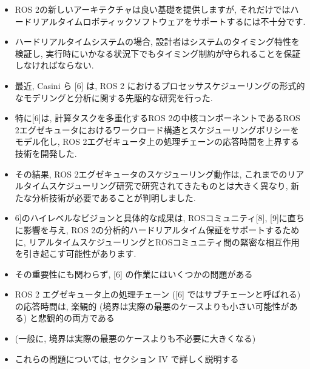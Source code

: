 \begin{frame}{}
    \begin{itemize}
        \item ROS 2の新しいアーキテクチャは良い基礎を提供しますが, それだけではハードリアルタイムロボティックソフトウェアをサポートするには不十分です.
        \item ハードリアルタイムシステムの場合, 設計者はシステムのタイミング特性を検証し, 実行時にいかなる状況下でもタイミング制約が守られることを保証しなければならない.
        \item 最近, Casini ら [6] は, ROS 2 におけるプロセッサスケジューリングの形式的なモデリングと分析に関する先駆的な研究を行った.
        \item 特に[6]は, 計算タスクを多重化するROS 2の中核コンポーネントであるROS 2エグゼキュータにおけるワークロード構造とスケジューリングポリシーをモデル化し, ROS 2エグゼキュータ上の処理チェーンの応答時間を上界する技術を開発した.
    \end{itemize}
\end{frame}

\begin{frame}{}
    \begin{itemize}
        \item その結果, ROS 2エグゼキュータのスケジューリング動作は, これまでのリアルタイムスケジューリング研究で研究されてきたものとは大きく異なり, 新たな分析技術が必要であることが判明しました.
        \item 6]のハイレベルなビジョンと具体的な成果は, ROSコミュニティ[8], [9]に直ちに影響を与え, ROS 2の分析的ハードリアルタイム保証をサポートするために, リアルタイムスケジューリングとROSコミュニティ間の緊密な相互作用を引き起こす可能性があります.
    \end{itemize}
\end{frame}


\begin{frame}{}
    \begin{itemize}
        \item その重要性にも関わらず, [6] の作業にはいくつかの問題がある
        \item ROS 2 エグゼキュータ上の処理チェーン ([6] ではサブチェーンと呼ばれる) の応答時間は, 楽観的 (境界は実際の最悪のケースよりも小さい可能性がある) と悲観的の両方である
        \item (一般に, 境界は実際の最悪のケースよりも不必要に大きくなる)
        \item これらの問題については, セクション IV で詳しく説明する
    \end{itemize}
\end{frame}

